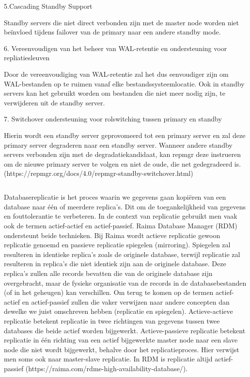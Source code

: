 5.Cascading Standby Support

Standby servers die niet direct verbonden zijn met de master node worden niet beïnvloed tijdens failover van de primary naar een andere standby mode.

6. Vereenvoudigen van het beheer van WAL-retentie en ondersteuning voor repliatiesleuven

Door de vereenvoudiging van WAL-retentie zal het dus eenvoudiger zijn om WAL-bestanden op te ruimen vanaf elke bestandssysteemlocatie. Ook in standby servers kan het gebruikt worden om bestanden die niet meer nodig zijn, te verwijderen uit de standby server.

7. Switchover ondersteuning voor rolswitching tussen primary en standby

Hierin wordt een standby server geprovomeerd tot een primary server en zal deze primary server degraderen naar een standby server. Wanneer andere standby servers verbonden zijn met de degradatiekandidaat, kan repmgr deze instrueren om de nieuwe primary server te volgen en niet de oude, die net gedegradeerd is. (https://repmgr.org/docs/4.0/repmgr-standby-switchover.html)


\subsection{}
\label{subsec:PgCluster}

\subsection{}
\label{subsec:Raima}

Databasereplicatie is het proces waarin we gegevens gaan kopiëren van een database naar één of meerdere replica's. Dit om de toegankelijkheid van gegevens en fouttolerantie te verbeteren.
In de context van replicatie gebruikt men vaak ook de termen actief-actief en actief-passief. Raima Database Manager (RDM) ondersteunt beide technieken. Bij Raima wordt actieve replicatie gewoon replicatie genoemd en passieve replicatie spiegelen (mirroring). Spiegelen zal resulteren in identieke replica's zoals de originele database, terwijl replicatie zal resulteren in replica's die niet identiek zijn aan de originele database. Deze replica's zullen alle records bevatten die van de originele database zijn overgebracht, maar de fysieke organisatie van de records in de databasebestanden (of in het geheugen) kan verschillen.
Om terug te komen op de termen actief-actief en actief-passief zullen die vaker verwijzen naar andere concepten dan dewelke we juist omschreven hebben (replicatie en spiegelen). Actieve-actieve replicatie betekent replicatie in twee richtingen van gegevens tussen twee databases die beide actief worden bijgewerkt. Actieve-passieve replicatie betekent replicatie in één richting van een actief bijgewerkte master node naar een slave node die niet wordt bijgewerkt, behalve door het replicatieproces. Hier verwijst men soms ook naar master-slave replicatie. In RDM is replicatie altijd actief-passief (https://raima.com/rdme-high-availability-database/).

